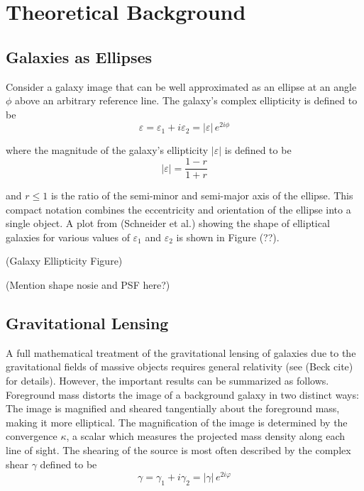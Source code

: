 \documentclass[%
 reprint,
 amsmath,amssymb,
 aps,
]{revtex4-1}
\begin{document}
\section{Theoretical Background}

\subsection*{Galaxies as Ellipses}
Consider a galaxy image that can be well approximated as an ellipse at an angle $\phi$ above an arbitrary reference line. The galaxy's complex ellipticity is defined to be 
\begin{equation}
\varepsilon=\varepsilon_1+i\varepsilon_2=|\varepsilon|\,e^{2i\phi}
\end{equation}

\noindent where the magnitude of the galaxy's ellipticity $|\varepsilon|$ is defined to be
\begin{equation}
|\varepsilon|=\frac{1-r}{1+r}
\end{equation}

\noindent and $r\leq1$ is the ratio of the semi-minor and semi-major axis of the ellipse. This compact notation combines the eccentricity and orientation of the ellipse into a single object. A plot from (Schneider et al.) showing the shape of elliptical galaxies for various values of $\varepsilon_1$ and $\varepsilon_2$ is shown in Figure (??).

(Galaxy Ellipticity Figure)

(Mention shape nosie and PSF here?)

\subsection*{Gravitational Lensing}

A full mathematical treatment of the gravitational lensing of galaxies due to the gravitational fields of massive objects requires general relativity (see (Beck cite) for details). However, the important results can be summarized as follows. Foreground mass distorts the image of a background galaxy in two distinct ways: The image is magnified and sheared tangentially about the foreground mass, making it more elliptical. The magnification of the image is determined by the convergence $\kappa$, a scalar which measures the projected mass density along each line of sight. The shearing of the source is most often described by the complex shear $\gamma$ defined to be
\begin{equation}
\gamma=\gamma_1+i\gamma_2=|\gamma|\,e^{2i\varphi}
\end{equation}
\end{document}
